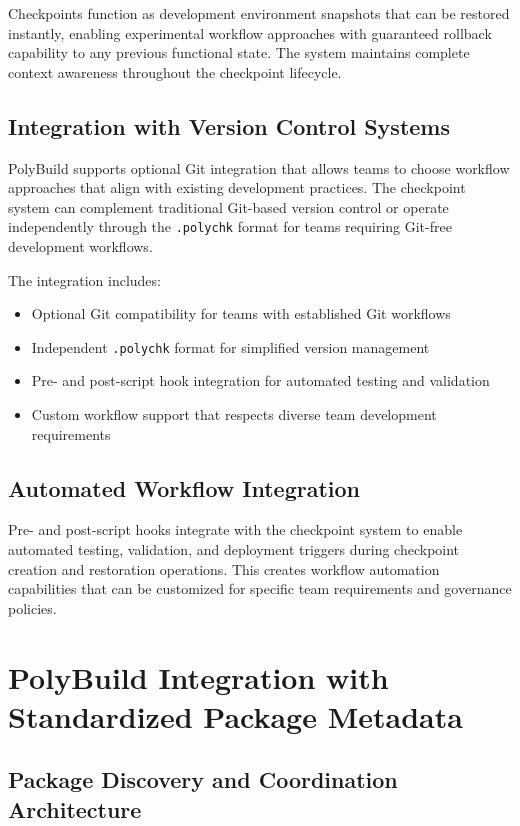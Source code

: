 Checkpoints function as development environment snapshots that can be restored instantly, enabling experimental workflow approaches with guaranteed rollback capability to any previous functional state. The system maintains complete context awareness throughout the checkpoint lifecycle.

\subsection{Integration with Version Control Systems}

PolyBuild supports optional Git integration that allows teams to choose workflow approaches that align with existing development practices. The checkpoint system can complement traditional Git-based version control or operate independently through the \texttt{.polychk} format for teams requiring Git-free development workflows.

The integration includes:
\begin{itemize}
\item Optional Git compatibility for teams with established Git workflows
\item Independent \texttt{.polychk} format for simplified version management
\item Pre- and post-script hook integration for automated testing and validation
\item Custom workflow support that respects diverse team development requirements
\end{itemize}

\subsection{Automated Workflow Integration}

Pre- and post-script hooks integrate with the checkpoint system to enable automated testing, validation, and deployment triggers during checkpoint creation and restoration operations. This creates workflow automation capabilities that can be customized for specific team requirements and governance policies.

\section{PolyBuild Integration with Standardized Package Metadata}

\subsection{Package Discovery and Coordination Architecture}

